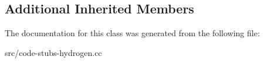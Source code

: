 \subsection*{Additional Inherited Members}


The documentation for this class was generated from the following file\+:\begin{DoxyCompactItemize}
\item 
src/code-\/stubs-\/hydrogen.\+cc\end{DoxyCompactItemize}
